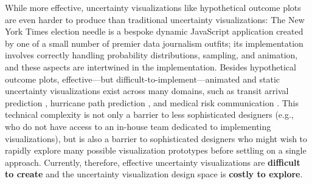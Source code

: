\documentclass[11pt]{article}
\begin{document}
While more effective, uncertainty visualizations like hypothetical outcome plots are even harder to produce than traditional uncertainty visualizations: The New York Times election needle is a bespoke dynamic JavaScript application created by one of a small number of premier data journalism outfits; its implementation involves correctly handling probability distributions, sampling, and animation, and these aspects are intertwined in the implementation. Besides hypothetical outcome plots, effective---but difficult-to-implement---animated and static uncertainty visualizations exist across many domains, such as transit arrival prediction , hurricane path prediction \cite{liu2016hurricane, padilla2017effects, Padilla2015, Cox2013hurricane, Mirzargar2014curve_boxplot}, and medical risk communication \cite{Ancker2006}. This technical complexity is not only a barrier to less sophisticated designers (e.g., who do not have access to an in-house team dedicated to implementing visualizations), but is also a barrier to sophisticated designers who might wish to rapidly explore many possible visualization prototypes before settling on a single approach. Currently, therefore, effective uncertainty visualizations are \textbf{difficult to create} and the uncertainty visualization design space is \textbf{costly to explore}.
\end{document}
